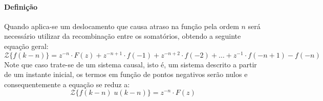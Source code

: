 \documentclass{article}
\begin{document}
    \paragraph{Definição}Quando aplica-se um deslocamento que causa atraso na função pela ordem $n$ será necessário utilizar da recombinação entre os somatórios, obtendo a seguinte equação geral:
    \begin{equation}
        \boxed{
            \mathcal{Z}\{ f(k-n) \} = 
            z^{-n}\cdot F(z) + 
            z^{-n+1}\cdot f(-1) + 
            z^{-n+2}\cdot f(-2) + \dots + 
            z^{-1}\cdot f(-n+1) - 
            f(-n)
        }
    \end{equation}
    Note que caso trate-se de um sistema causal, isto é, um sistema descrito a partir de um instante inicial, os termos em função de pontos negativos serão nulos e consequentemente a equação se reduz a:
    \begin{equation*}
        \mathcal{Z}\{ f(k-n) \; u(k-n)\} = z^{-n}\cdot F(z) 
    \end{equation*}
\end{document}
